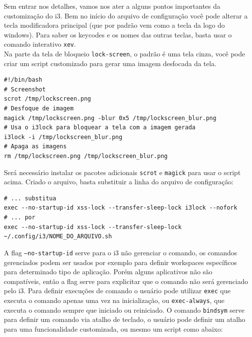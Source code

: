 \documentclass[12pt,a4paper]{article}
\begin{document}
\vspace{\baselineskip}

Sem entrar nos detalhes, vamos nos ater a alguns pontos importantes da customização do i3. Bem no início do arquivo de configuração você pode alterar a tecla modificadora principal (que por padrão vem como a tecla da logo do windows). Para saber os keycodes e os nomes das outras teclas, basta usar o comando interativo \texttt{xev}.\\

Na parte da tela de bloqueio \texttt{lock-screen}, o padrão é uma tela cinza, você pode criar um script customizado para gerar uma imagem desfocada da tela.\\

\begin{lstlisting}
#!/bin/bash
# Screenshot 
scrot /tmp/lockscreen.png
# Desfoque de imagem 
magick /tmp/lockscreen.png -blur 0x5 /tmp/lockscreen_blur.png
# Usa o i3lock para bloquear a tela com a imagem gerada
i3lock -i /tmp/lockscreen_blur.png
# Apaga as imagens
rm /tmp/lockscreen.png /tmp/lockscreen_blur.png
\end{lstlisting}

\vspace{\baselineskip}

Será necessário instalar os pacotes adicionais \texttt{scrot} e \texttt{magick} para usar o script acima. Criado o arquivo, basta substituir a linha do arquivo de configuração:\\

\begin{lstlisting}
# ... substitua 
exec --no-startup-id xss-lock --transfer-sleep-lock i3lock --nofork
# ... por 
exec --no-startup-id xss-lock --transfer-sleep-lock ~/.config/i3/NOME_DO_ARQUIVO.sh
\end{lstlisting}

\vspace{\baselineskip}

A flag \texttt{--no-startup-id} serve para o i3 não gerenciar o comando, os comandos gerenciados podem ser usados por exemplo para definir workspaces específicos para determinado tipo de aplicação. Porém alguns aplicativos não são compatíveis, então a flag serve para explicitar que o comando não será gerenciado pelo i3. Para definir execuções de comando o usuário pode utilizar \texttt{exec} que executa o comando apenas uma vez na inicialização, ou \texttt{exec-always}, que executa o comando sempre que iniciado ou reiniciado. O comando \texttt{bindsym} serve para definir um comando via atalho de teclado, o usuário pode definir um atalho para uma funcionalidade customizada, ou mesmo um script como abaixo: \\
\end{document}
